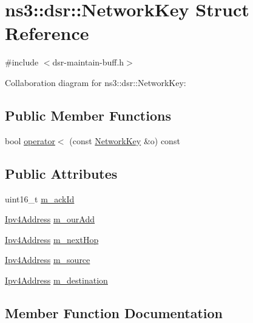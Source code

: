 \hypertarget{structns3_1_1dsr_1_1NetworkKey}{}\section{ns3\+:\+:dsr\+:\+:Network\+Key Struct Reference}
\label{structns3_1_1dsr_1_1NetworkKey}


{\ttfamily \#include $<$dsr-\/maintain-\/buff.\+h$>$}



Collaboration diagram for ns3\+:\+:dsr\+:\+:Network\+Key\+:
\subsection*{Public Member Functions}
\begin{DoxyCompactItemize}
\item 
bool \hyperlink{structns3_1_1dsr_1_1NetworkKey_a1100f932c8b5d6da8c4f8099fb7f94d5}{operator$<$} (const \hyperlink{structns3_1_1dsr_1_1NetworkKey}{Network\+Key} \&o) const 
\end{DoxyCompactItemize}
\subsection*{Public Attributes}
\begin{DoxyCompactItemize}
\item 
uint16\+\_\+t \hyperlink{structns3_1_1dsr_1_1NetworkKey_aafdfa6f8ef1630c3b8d1b9cc620a0b4f}{m\+\_\+ack\+Id}
\item 
\hyperlink{classns3_1_1Ipv4Address}{Ipv4\+Address} \hyperlink{structns3_1_1dsr_1_1NetworkKey_a2c8722ea0cdd9ac47b9a04f25e538edb}{m\+\_\+our\+Add}
\item 
\hyperlink{classns3_1_1Ipv4Address}{Ipv4\+Address} \hyperlink{structns3_1_1dsr_1_1NetworkKey_ade12c8c9b7d051739f94994949366449}{m\+\_\+next\+Hop}
\item 
\hyperlink{classns3_1_1Ipv4Address}{Ipv4\+Address} \hyperlink{structns3_1_1dsr_1_1NetworkKey_ad4728cd50cd0dc4cef5bf656da682a2e}{m\+\_\+source}
\item 
\hyperlink{classns3_1_1Ipv4Address}{Ipv4\+Address} \hyperlink{structns3_1_1dsr_1_1NetworkKey_a9f18a8ce232c07bf274a9871ba3ffca8}{m\+\_\+destination}
\end{DoxyCompactItemize}


\subsection{Member Function Documentation}
